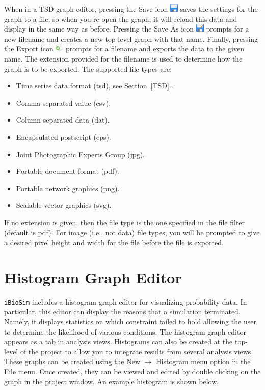 \documentclass[titlepage,11pt]{article}
\begin{document}
When in a TSD graph editor, pressing the Save icon \includegraphics{../gui/icons/save} saves the settings for the graph to a file, so when you re-open the graph, it will reload this data and display in the same way as before.  Pressing the Save As icon \includegraphics{../gui/icons/saveas} prompts for a new filename and creates a new top-level graph with that name.  Finally, pressing the Export icon \includegraphics{../gui/icons/export} prompts for a filename and exports the data to the given name.  The extension provided for the filename is used to determine how the graph is to be exported. The supported file types are: 
\begin{itemize}
\item Time series data format (tsd), see Section~\ref{TSD}..
\item Comma separated value (csv).
\item Column separated data (dat).
\item Encapsulated postscript (eps). 
\item Joint Photographic Experts Group (jpg). 
\item Portable document format (pdf).
\item Portable network graphics (png). 
\item Scalable vector graphics (svg).
\end{itemize}
If no extension is given, then the file type is the one specified in the file filter (default is pdf).  For image (i.e.,
not data) file types, you will be prompted to give a desired pixel height and width for the file before the file is exported. 

\clearpage

\section{\label{Histogram}Histogram Graph Editor}

\noindent
{\tt iBioSim} includes a histogram graph editor for visualizing probability data.  In particular, this editor can display the reasons that a simulation terminated.  Namely, it displays statistics on which constraint failed to hold allowing the user to determine the likelihood of various conditions.  The histogram graph editor appears as a tab in analysis
views.  Histograms can also be created at the top-level of the project to allow you to integrate results from several analysis views.  These graphs can be created using the New $\rightarrow$ Histogram menu option in the File menu. Once created, they can be viewed and edited by double clicking on the graph in the project window.  An example histogram is shown below.
\end{document}
